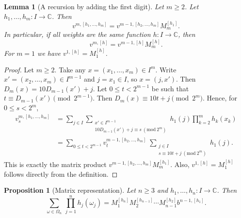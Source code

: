 \documentclass[11pt,a4paper]{article}
\newtheorem{lemma}{Lemma}
\newtheorem{proposition}{Proposition}
\theoremstyle{plain}
\begin{document}
\begin{lemma}[A recursion by adding the first digit]\label{lem:A}
Let $m\ge 2$. Let $h_1,\dots,h_m:I\to\mathbb{C}$. Then
\[
v^{m,[h_1,\dots,h_m]} = v^{m-1,[h_2,\dots,h_m]}  M_m^{[h_1]}.
\]
In particular, if all weights are the same function $h:I\to\mathbb{C}$, then
\[
v^{m,[h]} = v^{m-1,[h]}  M_m^{[h]}.
\]
For $m=1$ we have $v^{1,[h]} = M_1^{[h]}$.
\end{lemma}

\begin{proof}
Let $m\ge 2$.  
Take any $x=(x_1,\dots,x_m)\in I^m$. Write $x'=(x_2,\dots,x_m)\in I^{m-1}$ and $j=x_1\in I$, so $x=(j,x')$.  
Then $D_m(x)=10 D_{m-1}(x')+j$.
Let $0 \le t < 2^{m-1}$ be such that $t\equiv D_{m-1}(x')\pmod{2^{m-1}}$.  
Then $D_m(x)\equiv 10t+j \pmod{2^m}$.
Hence, for $0 \le s < 2^m$,
\begin{align*}
v^{m,[h_1,\dots,h_m]}_s
&=\sum_{j\in I}
\sum_{\substack{x'\in I^{m-1}\\ 10D_{m-1}(x')+j\equiv s\ (\mathrm{mod}\ 2^m)}}
h_1(j) \prod_{k=2}^m h_k(x_k) \\
&=\sum_{0\le t<2^{m-1}}
v_t^{m-1,[h_2,\dots,h_m]}\;
\sum_{\substack{j\in I\\ s\equiv 10t+j\ (\mathrm{mod}\ 2^m)}}
h_1(j).
\end{align*}
This is exactly the matrix product $v^{m-1,[h_2,\dots,h_m]} M_m^{[h_1]}$.  
Also, $v^{1,[h]}=M_1^{[h]}$ follows directly from the definition.
\end{proof}

\begin{proposition}[Matrix representation]\label{prop:main}
Let $n\ge 3$ and $h_1,\dots,h_n:I\to\mathbb{C}$. Then
\[
\sum_{\omega\in\Omega_n}\ \prod_{j=1}^n h_j(\omega_j)
=
M_1^{[h_n]}   M_2^{[h_{n-1}]} \cdots M_{n-1}^{[h_2]}   b^{n-1,[h_1]}.
\]
\end{proposition}
\end{document}

